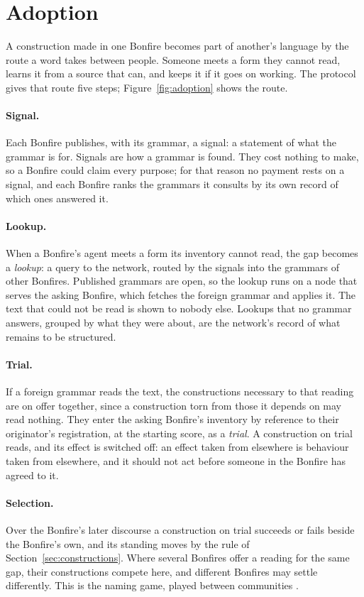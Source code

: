 \section{Adoption}\label{sec:adoption}

A construction made in one Bonfire becomes part of another's language by the route a word takes between people.
Someone meets a form they cannot read, learns it from a source that can, and keeps it if it goes on working. The
protocol gives that route five steps; Figure~\ref{fig:adoption} shows the route.

\paragraph{Signal.} Each Bonfire publishes, with its grammar, a signal: a statement of what the grammar is for.
Signals are how a grammar is found. They cost nothing to make, so a Bonfire could claim every purpose; for that
reason no payment rests on a signal, and each Bonfire ranks the grammars it consults by its own record of which
ones answered it.

\paragraph{Lookup.} When a Bonfire's agent meets a form its inventory cannot read, the gap becomes a \emph{lookup}:
a query to the network, routed by the signals into the grammars of other Bonfires. Published grammars are open, so
the lookup runs on a node that serves the asking Bonfire, which fetches the foreign grammar and applies it. The text that
could not be read is shown to nobody else. Lookups that no grammar answers, grouped by what they were about, are
the network's record of what remains to be structured.

\paragraph{Trial.} If a foreign grammar reads the text, the constructions necessary to that reading are on offer
together, since a construction torn from those it depends on may read nothing. They enter the asking Bonfire's
inventory by reference to their originator's registration, at the starting score, as a \emph{trial}. A construction
on trial reads, and its effect is switched off: an effect taken from elsewhere is behaviour taken from elsewhere,
and it should not act before someone in the Bonfire has agreed to it.

\paragraph{Selection.} Over the Bonfire's later discourse a construction on trial succeeds or fails beside the
Bonfire's own, and its standing moves by the rule of Section~\ref{sec:constructions}. Where several Bonfires offer
a reading for the same gap, their constructions compete here, and different Bonfires may settle differently. This
is the naming game, played between communities \citep{steels1995spatial,baronchelli2006sharp}.

